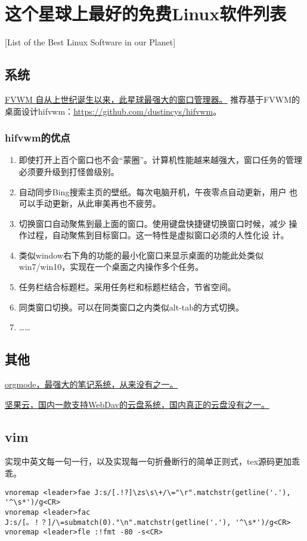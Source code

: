 
\chapter{这个星球上最好的免费Linux软件列表}[List of the Best Linux Software in our Planet]
\section{系统}

\href{http://fvwm.org/}{FVWM 自从上世纪诞生以来，此星球最强大的窗口管理器。}
推荐基于FVWM的桌面设计hifvwm：\href{https://github.com/dustincys/hifvwm}{https://github.com/dustincys/hifvwm}。

\subsection{hifvwm的优点}

\begin{enumerate}
	\item 即使打开上百个窗口也不会“蒙圈”。计算机性能越来越强大，窗口任务的管理必须要升级到打怪兽级别。
	\item 自动同步Bing搜索主页的壁纸。每次电脑开机，午夜零点自动更新，用户
		也可以手动更新，从此审美再也不疲劳。
	\item 切换窗口自动聚焦到最上面的窗口。使用键盘快捷键切换窗口时候，减少
		操作过程，自动聚焦到目标窗口。这一特性是虚拟窗口必须的人性化设
		计。
	\item 类似window右下角的功能的最小化窗口来显示桌面的功能此处类似
		win7/win10，实现在一个桌面之内操作多个任务。
	\item 任务栏结合标题栏。采用任务栏和标题栏结合，节省空间。
	\item 同类窗口切换。可以在同类窗口之内类似alt-tab的方式切换。
	\item ……
\end{enumerate}

\section{其他}

\href{https://orgmode.org/}{orgmode，最强大的笔记系统，从来没有之一。}

\href{https://www.jianguoyun.com/}{坚果云，国内一款支持WebDav的云盘系统，国内真正的云盘没有之一。}

\section{vim}
实现中英文每一句一行，以及实现每一句折叠断行的简单正则式，tex源码更加乖乖。
\begin{lstlisting}
vnoremap <leader>fae J:s/[.!?]\zs\s\+/\="\r".matchstr(getline('.'), '^\s*')/g<CR>
vnoremap <leader>fac J:s/[。！？]/\=submatch(0)."\n".matchstr(getline('.'), '^\s*')/g<CR>
vnoremap <leader>fle :!fmt -80 -s<CR>
\end{lstlisting}
